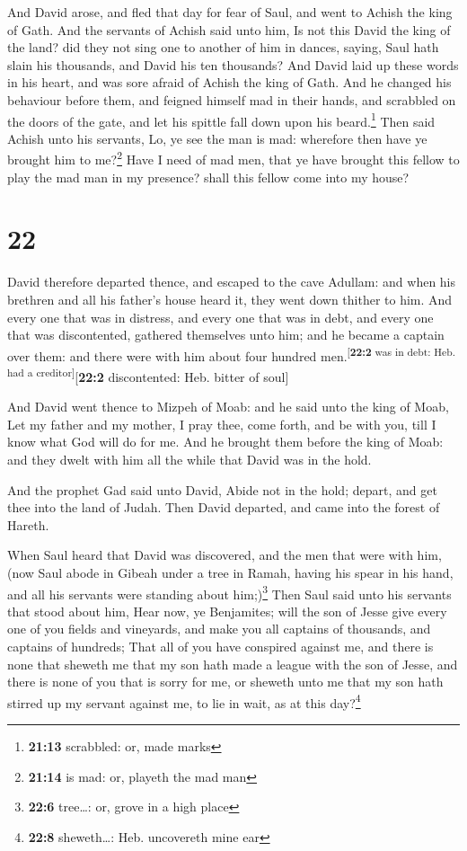  And David arose, and fled that day for fear of Saul, and
went to Achish the king of Gath.  And the servants of
Achish said unto him, Is not this David the king of the land? did they
not sing one to another of him in dances, saying, Saul hath slain his
thousands, and David his ten thousands?  And David laid
up these words in his heart, and was sore afraid of Achish the king of
Gath.  And he changed his behaviour before them, and
feigned himself mad in their hands, and scrabbled on the doors of the
gate, and let his spittle fall down upon his beard.\footnote{\textbf{21:13}
  scrabbled: or, made marks}  Then said Achish unto his
servants, Lo, ye see the man is mad: wherefore then have ye brought him
to me?\footnote{\textbf{21:14} is mad: or, playeth the mad man}
 Have I need of mad men, that ye have brought this fellow
to play the mad man in my presence? shall this fellow come into my
house?

\hypertarget{section-21}{%
\section{22}\label{section-21}}

 David therefore departed thence, and escaped to the cave
Adullam: and when his brethren and all his father's house heard it, they
went down thither to him.  And every one that was in
distress, and every one that was in debt, and every one that was
discontented, gathered themselves unto him; and he became a captain over
them: and there were with him about four hundred
men.\textsuperscript{{[}\textbf{22:2} was in debt: Heb. had a
creditor{]}}{[}\textbf{22:2} discontented: Heb. bitter of soul{]}

 And David went thence to Mizpeh of Moab: and he said unto
the king of Moab, Let my father and my mother, I pray thee, come forth,
and be with you, till I know what God will do for me.  And
he brought them before the king of Moab: and they dwelt with him all the
while that David was in the hold.

 And the prophet Gad said unto David, Abide not in the
hold; depart, and get thee into the land of Judah. Then David departed,
and came into the forest of Hareth.

 When Saul heard that David was discovered, and the men
that were with him, (now Saul abode in Gibeah under a tree in Ramah,
having his spear in his hand, and all his servants were standing about
him;)\footnote{\textbf{22:6} tree\ldots: or, grove in a high place}
 Then Saul said unto his servants that stood about him,
Hear now, ye Benjamites; will the son of Jesse give every one of you
fields and vineyards, and make you all captains of thousands, and
captains of hundreds;  That all of you have conspired
against me, and there is none that sheweth me that my son hath made a
league with the son of Jesse, and there is none of you that is sorry for
me, or sheweth unto me that my son hath stirred up my servant against
me, to lie in wait, as at this day?\footnote{\textbf{22:8}
  sheweth\ldots: Heb. uncovereth mine ear}

